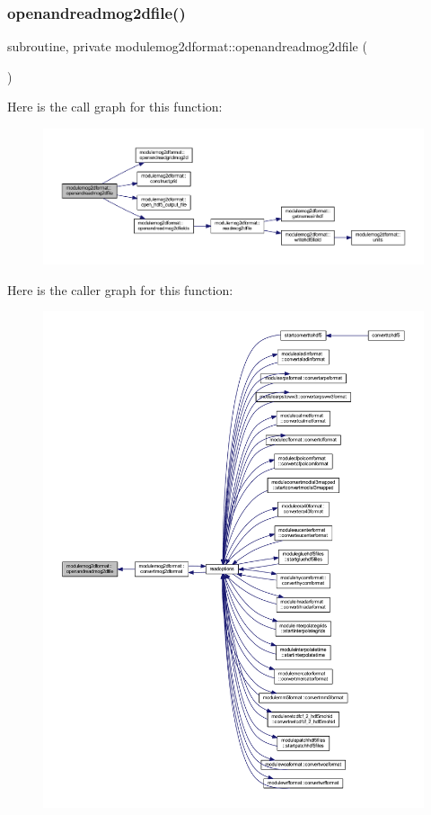 \subsubsection{\texorpdfstring{openandreadmog2dfile()}{openandreadmog2dfile()}}
{\footnotesize\ttfamily subroutine, private modulemog2dformat\+::openandreadmog2dfile (\begin{DoxyParamCaption}{ }\end{DoxyParamCaption})\hspace{0.3cm}{\ttfamily [private]}}

Here is the call graph for this function\+:\nopagebreak
\begin{figure}[H]
\begin{center}
\leavevmode
\includegraphics[width=350pt]{namespacemodulemog2dformat_a9fd3a03a7c7ed9e05602123a50dc5726_cgraph}
\end{center}
\end{figure}
Here is the caller graph for this function\+:\nopagebreak
\begin{figure}[H]
\begin{center}
\leavevmode
\includegraphics[width=350pt]{namespacemodulemog2dformat_a9fd3a03a7c7ed9e05602123a50dc5726_icgraph}
\end{center}
\end{figure}
